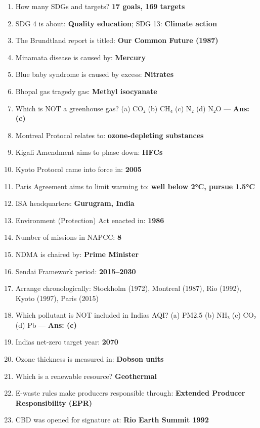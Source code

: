 \begin{enumerate}
\def\labelenumi{\arabic{enumi}.}
\tightlist
\item
  How many SDGs and targets? \textbf{17 goals, 169 targets}
\item
  SDG 4 is about: \textbf{Quality education}; SDG 13: \textbf{Climate action}
\item
  The Brundtland report is titled: \textbf{Our Common Future (1987)}
\item
  Minamata disease is caused by: \textbf{Mercury}
\item
  Blue baby syndrome is caused by excess: \textbf{Nitrates}
\item
  Bhopal gas tragedy gas: \textbf{Methyl isocyanate}
\item
  Which is NOT a greenhouse gas? (a) CO₂ (b) CH₄ (c) N₂ (d) N₂O --- \textbf{Ans: (c)}
\item
  Montreal Protocol relates to: \textbf{ozone-depleting substances}
\item
  Kigali Amendment aims to phase down: \textbf{HFCs}
\item
  Kyoto Protocol came into force in: \textbf{2005}
\item
  Paris Agreement aims to limit warming to: \textbf{well below 2°C, pursue 1.5°C}
\item
  ISA headquarters: \textbf{Gurugram, India}
\item
  Environment (Protection) Act enacted in: \textbf{1986}
\item
  Number of missions in NAPCC: \textbf{8}
\item
  NDMA is chaired by: \textbf{Prime Minister}
\item
  Sendai Framework period: \textbf{2015--2030}
\item
  Arrange chronologically: Stockholm (1972), Montreal (1987), Rio (1992), Kyoto (1997), Paris (2015)
\item
  Which pollutant is NOT included in India\textquotesingle s AQI? (a) PM2.5 (b) NH₃ (c) CO₂ (d) Pb --- \textbf{Ans: (c)}
\item
  India\textquotesingle s net-zero target year: \textbf{2070}
\item
  Ozone thickness is measured in: \textbf{Dobson units}
\item
  Which is a renewable resource? \textbf{Geothermal}
\item
  E-waste rules make producers responsible through: \textbf{Extended Producer Responsibility (EPR)}
\item
  CBD was opened for signature at: \textbf{Rio Earth Summit 1992}
\end{enumerate}

